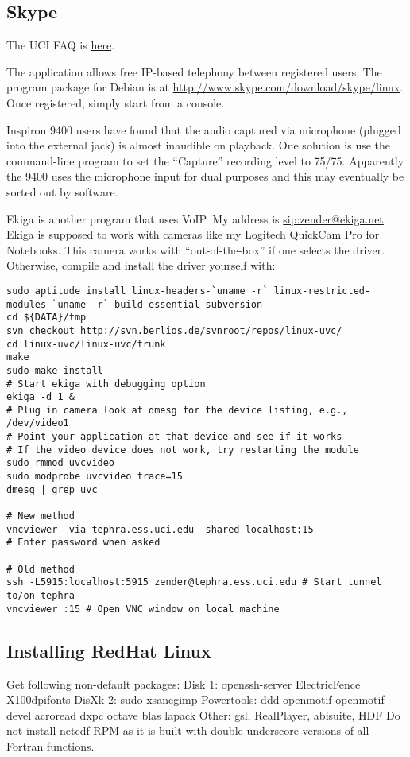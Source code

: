 \documentclass[12pt,twoside]{article}
\begin{document}
\subsection{Skype}\label{sxn:skype}
The UCI  FAQ is
\href{http://www.nacs.uci.edu/telephone/voip-faq.html}{here}. 

The  application allows free IP-based telephony
between registered users.
The  program package for Debian is at
\url{http://www.skype.com/download/skype/linux}.
Once registered, simply start  from a console.

Inspiron 9400 users have found that the audio captured via microphone
(plugged into the external jack) is almost inaudible on
playback. 
One solution is use the command-line  program to 
set the ``Capture'' recording level to 75/75.
Apparently the 9400 uses the microphone input for dual purposes and
this may eventually be sorted out by software.

Ekiga is another program that uses VoIP.
My  address is \url{sip:zender@ekiga.net}.
Ekiga is supposed to work with cameras like my Logitech QuickCam Pro
for Notebooks.
This camera works with  ``out-of-the-box'' if one
selects the  driver.
Otherwise, compile and install the driver yourself with:
\begin{verbatim}
sudo aptitude install linux-headers-`uname -r` linux-restricted-modules-`uname -r` build-essential subversion
cd ${DATA}/tmp
svn checkout http://svn.berlios.de/svnroot/repos/linux-uvc/
cd linux-uvc/linux-uvc/trunk
make
sudo make install
# Start ekiga with debugging option
ekiga -d 1 &
# Plug in camera look at dmesg for the device listing, e.g., /dev/video1
# Point your application at that device and see if it works
# If the video device does not work, try restarting the module
sudo rmmod uvcvideo
sudo modprobe uvcvideo trace=15
dmesg | grep uvc

# New method
vncviewer -via tephra.ess.uci.edu -shared localhost:15
# Enter password when asked

# Old method
ssh -L5915:localhost:5915 zender@tephra.ess.uci.edu # Start tunnel to/on tephra
vncviewer :15 # Open VNC window on local machine
\end{verbatim}

\subsection{Installing RedHat Linux}\label{sxn:rhl}
Get following non-default packages:
Disk 1: openssh-server ElectricFence X100dpifonts
DisXk 2: sudo xsanegimp
Powertools: ddd openmotif openmotif-devel acroread dxpc octave blas lapack
Other: gsl, RealPlayer, abisuite, HDF
Do not install netcdf RPM as it is built with double-underscore versions
of all Fortran functions.
\end{document}
